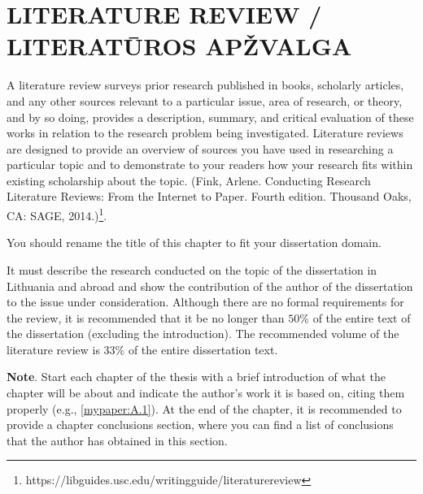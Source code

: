 
\setcounter{chapter}{0}

\chapter{\MakeUppercase{Literature review / Literatūros apžvalga}} %
\label{cha:review}


A literature review surveys prior research published in books, scholarly articles, and any other sources relevant to a particular issue, area of research, or theory, and by so doing, provides a description, summary, and critical evaluation of these works in relation to the research problem being investigated. Literature reviews are designed to provide an overview of sources you have used in researching a particular topic and to demonstrate to your readers how your research fits within existing scholarship about the topic.  (Fink, Arlene. Conducting Research Literature Reviews: From the Internet to Paper. Fourth edition. Thousand Oaks, CA: SAGE, 2014.)\footnote{https://libguides.usc.edu/writingguide/literaturereview}. 

You should rename the title of this chapter to fit your dissertation domain. 

It must describe the research conducted on the topic of the dissertation in Lithuania and abroad and show the contribution of the author of the dissertation to the issue under consideration.
Although there are no formal requirements for the review, it is recommended that it be no longer than $50\%$ of the entire text of the dissertation (excluding the introduction). The recommended volume of the literature review is $33\%$ of the entire dissertation text.

\textbf{Note}. Start each chapter of the thesis with a brief introduction of what the chapter will be about and indicate the author's work it is based on, citing them properly (e.g., \ref{mypaper:A.1}). At the end of the chapter, it is recommended to provide a chapter conclusions section, where you can find a list of conclusions that the author has obtained in this section.


